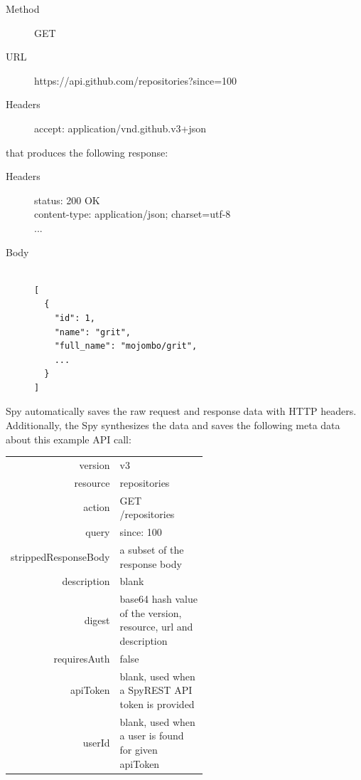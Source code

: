 \documentclass[conference]{IEEEtran}
\begin{document}
\footnotesize
\begin{description}
  \item[Method] GET
  \item[URL] https://api.github.com/repositories?since=100
  \item[Headers] accept: application/vnd.github.v3+json
\end{description}
\normalsize
that produces the following response:
\footnotesize
\begin{description}
  \item[Headers] status: 200 OK \\
content-type: application/json; charset=utf-8 \\
...
  \item[Body]
\begin{lstlisting}

[
  {
    "id": 1,
    "name": "grit",
    "full_name": "mojombo/grit",
    ...
  }
]\end{lstlisting}
\end{description}
\normalsize
Spy automatically saves the raw request and response data with HTTP headers. Additionally, the Spy synthesizes the data and saves the following meta data about this example API call:

\footnotesize
\begin{tabular}{r p{0.55\linewidth}}
  version & v3 \\
  resource & repositories \\
  action & GET /repositories \\
  query & since: 100 \\
  strippedResponseBody & a subset of the response body \\
  description & blank \\
  digest & base64 hash value of the version, resource, url and description \\
  requiresAuth & false \\
  apiToken & blank, used when a SpyREST API token is provided \\
  userId & blank, used when a user is found for given apiToken \\
\end{tabular}
\normalsize
\end{document}
